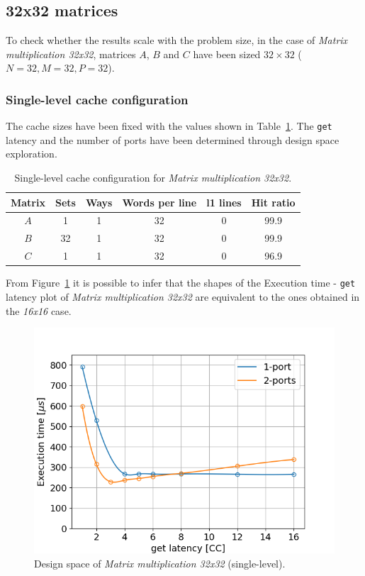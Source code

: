 \documentclass[11pt,a4paper,oneside]{memoir}
\begin{document}
\subsection{32x32 matrices}
To check whether the results scale with the problem size, in the case of
\emph{Matrix multiplication 32x32}, matrices $A$, $B$ and $C$ have been sized
$32 \times 32$ ($N = 32, M = 32, P = 32$).

\subsubsection{Single-level cache configuration}
The cache sizes have been fixed with the values shown in
Table~\ref{tab:matmul_32_no_l1_config}. The \texttt{get} latency and the number
of ports have been determined through design space exploration.

\begin{table}[H]
	\begin{center}
		\begin{tabular}{cccccc}
			\hline
			\rowcolor{gray!50}
			\textbf{Matrix} & \textbf{Sets} & \textbf{Ways} &
			\textbf{Words per line} & \textbf{\ac{l1} lines} &
			\textbf{Hit ratio} \\
			\hline
			$A$ & 1 & 1 & 32 & 0 & 99.9 \\
			\rowcolor{gray!25}
			$B$ & 32 & 1 & 32 & 0 & 99.9 \\
			$C$ & 1 & 1 & 32 & 0 & 96.9 \\
			\hline
		\end{tabular}
	\end{center}
	\caption{Single-level cache configuration for \emph{Matrix
	multiplication 32x32}.}
	\label{tab:matmul_32_no_l1_config}
\end{table}

From Figure~\ref{fig:matmul_32_no_l1_space} it is possible to infer that the
shapes of the Execution time - \texttt{get} latency plot of \emph{Matrix
multiplication 32x32} are equivalent to the ones obtained in the \emph{16x16}
case.

\begin{figure}[H]
	\centering
	\includegraphics[width=.8\textwidth]{matmul_32_multiport_no_L1_latency}
	\caption{Design space of \emph{Matrix multiplication 32x32}
	(single-level).}
	\label{fig:matmul_32_no_l1_space}
\end{figure}
\end{document}

